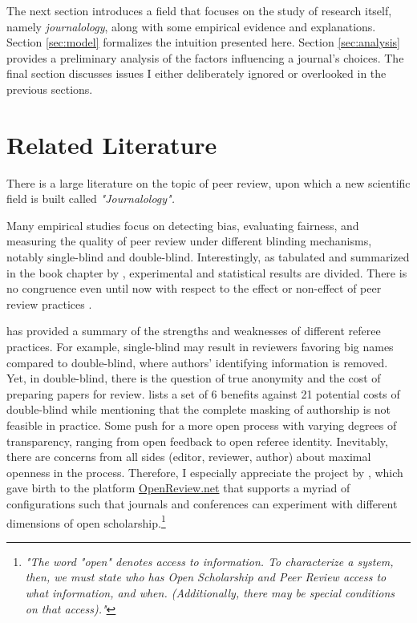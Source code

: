 \documentclass[12pt]{article}
\begin{document}
The next section introduces a field that focuses on the study of research
itself, namely \textit{journalology}, along with some empirical evidence and
explanations. Section \ref{sec:model} formalizes the intuition presented here.
Section \ref{sec:analysis} provides a preliminary analysis of the factors
influencing a journal's choices. The final section discusses issues I either
deliberately ignored or overlooked in the previous sections.

\section{Related Literature}
There is a large literature on the topic of peer review, upon which a new
scientific field is built called \textit{"Journalology".}

Many empirical studies focus on detecting bias, evaluating fairness, and
measuring the quality of peer review under different blinding mechanisms,
notably single-blind and double-blind. Interestingly, as tabulated and
summarized in the book chapter by \citet{largent2016blind}, experimental and
statistical results are divided. There is no congruence even until now with
respect to the effect or non-effect of peer review practices
\cite{blank1991effects,tomkins2017reviewer}.

\citet{tan2018peer} has provided a summary of the strengths and weaknesses of different referee practices. For example, single-blind may result in reviewers favoring big names compared to double-blind, where authors' identifying information is removed. Yet, in double-blind, there is the question of true anonymity and the cost of preparing papers for review. \cite{snodgrass2007single} lists a set of 6 benefits against 21 potential costs of double-blind while mentioning that the complete masking of authorship is not feasible in practice. Some push for a more open process with varying degrees of transparency, ranging from open feedback to open referee identity. Inevitably, there are concerns from all sides (editor, reviewer, author) about maximal openness in the process. Therefore, I especially appreciate the project by \citet{soergel2013open}, which gave birth to the platform \href{https://openreview.net/}{OpenReview.net} that supports a myriad of configurations such that journals and conferences can experiment with different dimensions of open scholarship.\footnote{\textit{"The word "open" denotes access to information. To characterize a system, then, we must state who has Open Scholarship and Peer Review access to what information, and when. (Additionally, there may be special conditions on that access)."}}
\end{document}
